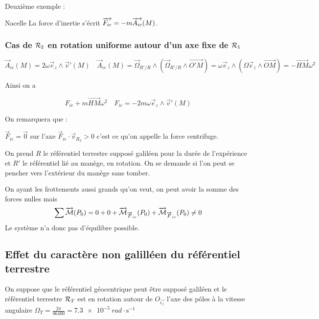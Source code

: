 \documentclass[a4paper,french,bookmarks]{book}
\begin{document}
    Deuxième exemple :
    \begin{example}{Nacelle}{}
        La force d'inertie s'écrit $\overrightarrow{F_{ie}} = -m\overrightarrow{A_{ie}}\!\left(M\right)$.
    \end{example}
    
    \subsubsection{Cas de $\mathcal{R}_2$ en rotation uniforme autour d'un axe fixe de $\mathcal{R}_1$}

    \[\vec A_{ic}(M) = 2 \omega\vec e_z \wedge \vec v'(M) \quad \vec A_{ie}(M) = \vec\Omega_{R'/R} \wedge \left(\vec\Omega_{R'/R} \wedge \vec{O'M} \right) = \omega\vec e_z \wedge (\Omega\vec e_z \wedge \vec{OM}) = - \vec{HM} \omega^2 \]
    \begin{center}Ainsi on a\end{center} \[ F_{ie} + m \vec{HM} \omega^2 \quad F_{ic} = -2m \omega \vec e_z \wedge \vec v'(M)\]

    On remarquera que :
    \begin{enumerate}
        \itt \(\vec F_{ie} = \vec 0\) sur l'axe
        \itt \(\vec F_{ie} \cdot \vec v_{R_2} > 0\) c'est ce qu'on appelle la force centrifuge.
    \end{enumerate}

    \begin{example}{}{}

        On prend \(R\) le référentiel terrestre supposé galiléen pour la durée de l'expérience et \(R'\) le référentiel lié au manège, en rotation. On se demande si l'on peut se pencher vers l'extérieur du manège sans tomber.

        On ayant les  frottements aussi grands qu'on veut, on peut avoir la somme des forces nulles mais 
        \[\sum \overrightarrow{\mathcal{M}}(P_0) = 0 + 0 + \overrightarrow{\mathcal{M}}_{\overrightarrow{F}_{ie}}(P_0) + \overrightarrow{\mathcal{M}}_{\overrightarrow{F}_{ic}}(P_0) \neq 0\]
        Le système n'a donc pas d'équilibre possible.
    \end{example}
    
    \subsection{Effet du caractère non galilléen du référentiel terrestre}

    On suppose que le référentiel géocentrique peut être supposé galiléen et le référentiel terrestre \(\mathcal{R}_T\) est en rotation autour de \(O_{\vec{e_z}}\)  l'axe des pôles à la vitesse angulaire \(\Omega_T = \frac{2\pi}{86400} = \SI{7.3e-5}{rad \cdot \second^{-1}}\)
\end{document}
